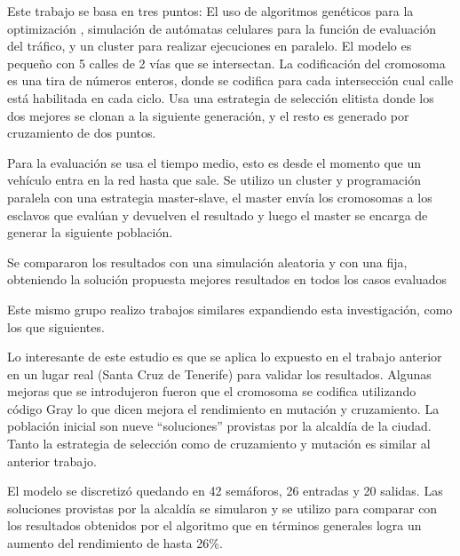\begin{itemize}
	\begin{item}
		
		Este trabajo se basa en tres puntos: El uso de algoritmos genéticos para la optimización , simulación de autómatas celulares para la función de evaluación del tráfico, y un cluster para realizar ejecuciones en paralelo.
		El modelo es pequeño con 5 calles de 2 vías que se intersectan.
		La codificación del cromosoma es una tira de números enteros, donde se codifica para cada intersección cual calle está habilitada en cada ciclo.
		Usa una estrategia de selección elitista donde los dos mejores se clonan a la siguiente generación, y el resto es generado por cruzamiento de dos puntos.
		
		Para la evaluación se usa el tiempo medio, esto es desde el momento que un vehículo entra en la red hasta que sale. Se utilizo un cluster y programación paralela con una estrategia master-slave, el master envía los cromosomas a los esclavos que evalúan y devuelven el resultado y luego el master se encarga de generar la siguiente población.
		
		Se compararon los resultados con una simulación aleatoria y con una fija, obteniendo la solución propuesta mejores resultados en todos los casos evaluados
		
		Este mismo grupo realizo trabajos similares expandiendo esta investigación, como los que siguientes.
	\end{item}
	
	\begin{item}
		\bibentry{Sanchez2008}
		Lo interesante de este estudio es que se aplica lo expuesto en el trabajo anterior en un lugar real (Santa Cruz de Tenerife) para validar los resultados.
		Algunas mejoras que se introdujeron fueron que el cromosoma se codifica utilizando código Gray lo que dicen mejora el rendimiento en mutación y cruzamiento. La población inicial son nueve “soluciones” provistas por la alcaldía de la ciudad. Tanto la estrategia de selección como de cruzamiento y mutación  es similar al anterior trabajo.
		
		El modelo se discretizó quedando en 42 semáforos, 26 entradas y 20 salidas.
		Las soluciones provistas por la alcaldía se simularon y se utilizo para comparar con los resultados obtenidos por el algoritmo que en términos generales logra un aumento del rendimiento de hasta 26\%.
		
	\end{item}
	

\end{itemize}
